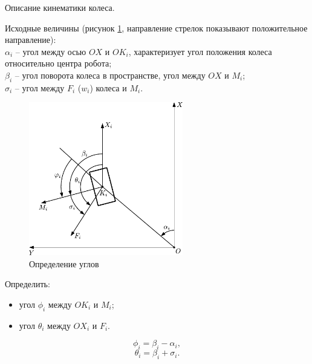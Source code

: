 \documentclass[a4paper,12pt]{article}
\begin{document}
\begin{lemma}
    Описание кинематики колеса.

    Исходные величины (рисунок \ref{fig:lemma1}, направление стрелок показывают положительное направление): \\
    \(\alpha_i\) -- угол между осью \(OX\) и \(OK_i\), характеризует угол положения колеса относительно центра робота; \\
    \(\beta_i\) -- угол поворота колеса в пространстве, угол между \(OX\) и \(M_i\); \\
    \(\sigma_i\) -- угол между \(F_i\) (\(w_i\)) колеса и \(M_i\).

    \begin{figure}[H]
        \centering
        \includegraphics[width=0.6\textwidth]{lemma1.pdf}
        \caption{Определение углов}
        \label{fig:lemma1}
    \end{figure}

    Определить:
    \begin{itemize}
        \item угол \(\phi_i\) между \(OK_i\) и \(M_i\);
        \item угол \(\theta_i\) между \(OX_i\) и \(F_i\).
    \end{itemize}

    \[
        \phi_i = \beta_i - \alpha_i
    ,\]
    \[
        \theta_i = \beta_i + \sigma_i    
    .\] 
\end{lemma}
\end{document}
